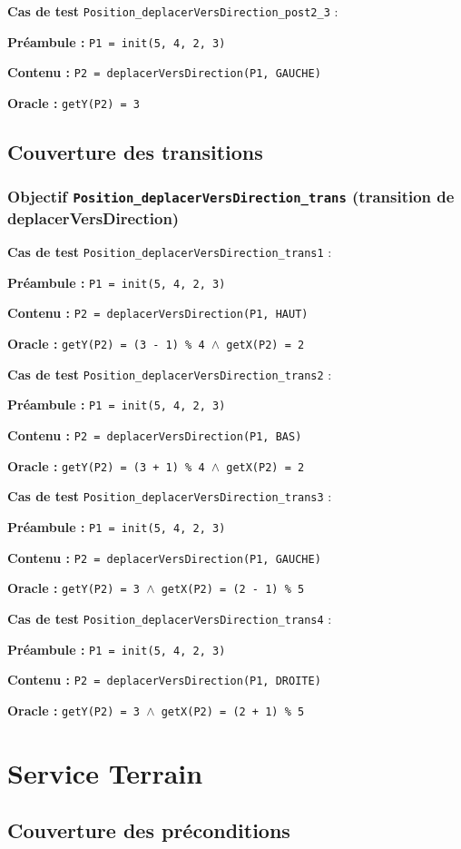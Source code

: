 \documentclass{article}
\newcommand{\cmd}[1]{\texttt{#1}}
\newcommand{\lAND}{$\land$}
\newcommand{\obj}[2]{\subsubsection*{\large{\textbf{Objectif {\cmd{#1} (#2)}}}}}
\newenvironment{cas}[1]
{
	\hspace{1em}\textbf{Cas de test} \cmd{#1} :
	\begin{list}{}{}
}{
	\end{list}\vspace{1em}
}
\newcommand{\pre}[1]{\item \textbf{Préambule :} \cmd{#1}}
\newcommand{\ope}[1]{\item \textbf{Contenu :} \cmd{#1}}
\newcommand{\ora}[1]{\item \textbf{Oracle :} \cmd{#1}}
\begin{document}
	\begin{cas} {Position\_deplacerVersDirection\_post2\_3}
		\pre{P1 = init(5, 4, 2, 3)}
		\ope{P2 = deplacerVersDirection(P1, GAUCHE)}
		\ora{getY(P2) = 3}
	\end{cas}


\subsection*{Couverture des transitions}

\obj{Position\_deplacerVersDirection\_trans} {transition de deplacerVersDirection}
	\begin{cas} {Position\_deplacerVersDirection\_trans1}
		\pre{P1 = init(5, 4, 2, 3)}
		\ope{P2 = deplacerVersDirection(P1, HAUT)}
		\ora{getY(P2) = (3 - 1) \% 4 \lAND{} getX(P2) = 2}
	\end{cas}

	\begin{cas} {Position\_deplacerVersDirection\_trans2}
		\pre{P1 = init(5, 4, 2, 3)}
		\ope{P2 = deplacerVersDirection(P1, BAS)}
		\ora{getY(P2) = (3 + 1) \% 4 \lAND{} getX(P2) = 2}
	\end{cas}


	\begin{cas} {Position\_deplacerVersDirection\_trans3}
		\pre{P1 = init(5, 4, 2, 3)}
		\ope{P2 = deplacerVersDirection(P1, GAUCHE)}
		\ora{getY(P2) = 3 \lAND{} getX(P2) = (2 - 1) \% 5}
	\end{cas}


	\begin{cas} {Position\_deplacerVersDirection\_trans4}
		\pre{P1 = init(5, 4, 2, 3)}
		\ope{P2 = deplacerVersDirection(P1, DROITE)}
		\ora{getY(P2) = 3 \lAND{} getX(P2) = (2 + 1) \% 5}
	\end{cas}

\clearpage{}





















\section{Service Terrain}

\subsection*{Couverture des préconditions}
\end{document}
